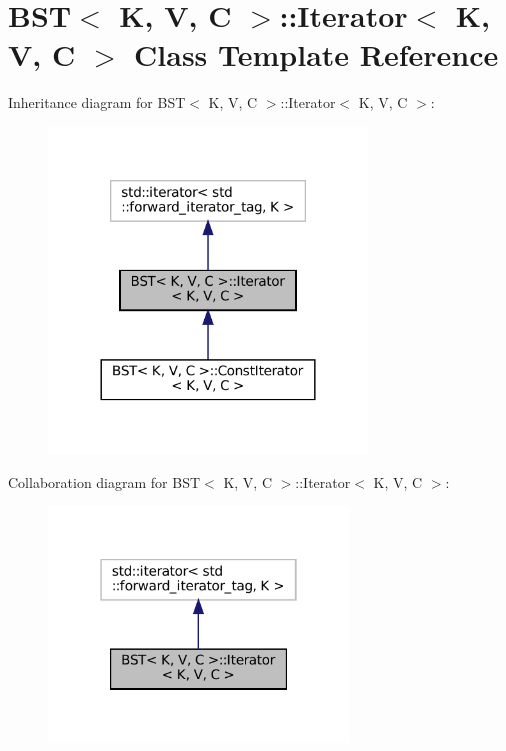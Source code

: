 \hypertarget{classBST_1_1Iterator}{}\section{B\+ST$<$ K, V, C $>$\+:\+:Iterator$<$ K, V, C $>$ Class Template Reference}
\label{classBST_1_1Iterator}


Inheritance diagram for B\+ST$<$ K, V, C $>$\+:\+:Iterator$<$ K, V, C $>$\+:
\nopagebreak
\begin{figure}[H]
\begin{center}
\leavevmode
\includegraphics[width=240pt]{classBST_1_1Iterator__inherit__graph}
\end{center}
\end{figure}


Collaboration diagram for B\+ST$<$ K, V, C $>$\+:\+:Iterator$<$ K, V, C $>$\+:
\nopagebreak
\begin{figure}[H]
\begin{center}
\leavevmode
\includegraphics[width=226pt]{classBST_1_1Iterator__coll__graph}
\end{center}
\end{figure}
